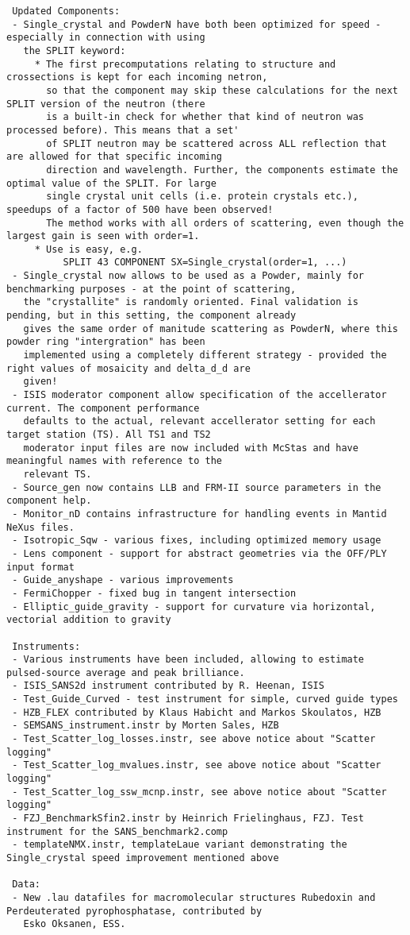 \begin{lstlisting}
 Updated Components:
 - Single_crystal and PowderN have both been optimized for speed - especially in connection with using
   the SPLIT keyword:
     * The first precomputations relating to structure and crossections is kept for each incoming netron,
       so that the component may skip these calculations for the next SPLIT version of the neutron (there
       is a built-in check for whether that kind of neutron was processed before). This means that a set'
       of SPLIT neutron may be scattered across ALL reflection that are allowed for that specific incoming
       direction and wavelength. Further, the components estimate the optimal value of the SPLIT. For large
       single crystal unit cells (i.e. protein crystals etc.), speedups of a factor of 500 have been observed!
       The method works with all orders of scattering, even though the largest gain is seen with order=1.
     * Use is easy, e.g.
          SPLIT 43 COMPONENT SX=Single_crystal(order=1, ...)
 - Single_crystal now allows to be used as a Powder, mainly for benchmarking purposes - at the point of scattering,
   the "crystallite" is randomly oriented. Final validation is pending, but in this setting, the component already
   gives the same order of manitude scattering as PowderN, where this powder ring "intergration" has been 
   implemented using a completely different strategy - provided the right values of mosaicity and delta_d_d are
   given!
 - ISIS moderator component allow specification of the accellerator current. The component performance
   defaults to the actual, relevant accellerator setting for each target station (TS). All TS1 and TS2
   moderator input files are now included with McStas and have meaningful names with reference to the 
   relevant TS. 
 - Source_gen now contains LLB and FRM-II source parameters in the component help.
 - Monitor_nD contains infrastructure for handling events in Mantid NeXus files.
 - Isotropic_Sqw - various fixes, including optimized memory usage
 - Lens component - support for abstract geometries via the OFF/PLY input format
 - Guide_anyshape - various improvements
 - FermiChopper - fixed bug in tangent intersection
 - Elliptic_guide_gravity - support for curvature via horizontal, vectorial addition to gravity

 Instruments:
 - Various instruments have been included, allowing to estimate pulsed-source average and peak brilliance.
 - ISIS_SANS2d instrument contributed by R. Heenan, ISIS
 - Test_Guide_Curved - test instrument for simple, curved guide types
 - HZB_FLEX contributed by Klaus Habicht and Markos Skoulatos, HZB
 - SEMSANS_instrument.instr by Morten Sales, HZB
 - Test_Scatter_log_losses.instr, see above notice about "Scatter logging"
 - Test_Scatter_log_mvalues.instr, see above notice about "Scatter logging"
 - Test_Scatter_log_ssw_mcnp.instr, see above notice about "Scatter logging"
 - FZJ_BenchmarkSfin2.instr by Heinrich Frielinghaus, FZJ. Test instrument for the SANS_benchmark2.comp
 - templateNMX.instr, templateLaue variant demonstrating the Single_crystal speed improvement mentioned above

 Data:
 - New .lau datafiles for macromolecular structures Rubedoxin and Perdeuterated pyrophosphatase, contributed by
   Esko Oksanen, ESS.

\end{lstlisting}
